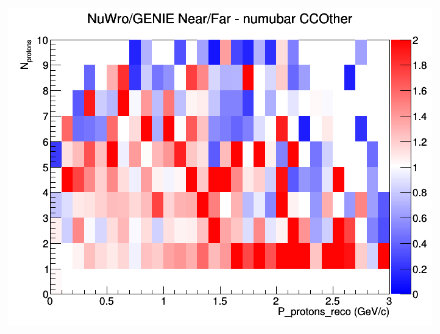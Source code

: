 \documentclass[12pt]{article}
\begin{document}
\begin{figure}[h]
\endminipage
{}
\includegraphics[width=\linewidth]{eff_N_P/LAr/protons/ratios/CCOther_NuWro_GENIE_numubar_NF_N_P.png}
\endminipage
\newline
\end{figure}
\clearpage
\end{document}
